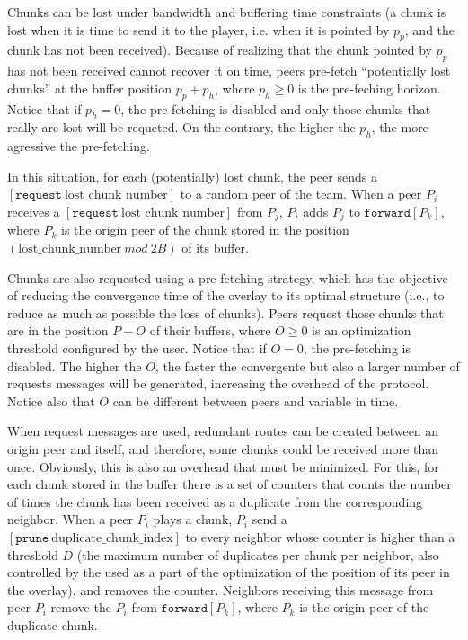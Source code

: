 

\label{sec:routes_discovery}

Chunks can be lost under bandwidth and buffering time constraints (a
chunk is lost when it is time to send it to the player, i.e. when it
is pointed by $p_p$, and the chunk has not been received). Because of
realizing that the chunk pointed by $p_p$ has not been received cannot
recover it on time, peers pre-fetch ``potentially lost chunks'' at the
buffer position $p_p+p_h$, where $p_h\geq 0$ is the pre-feching
horizon. Notice that if $p_h=0$, the pre-fetching is disabled and only
those chunks that really are lost will be requeted. On the contrary,
the higher the $p_h$, the more agressive the pre-fetching.

In this situation, for each (potentially) lost chunk, the peer sends a
$[\mathtt{request}~\text{lost\_chunk\_number}]$ to a random peer of
the team. When a peer $P_i$ receives a
$[\mathtt{request}~\text{lost\_chunk\_number}]$ from $P_j$, $P_i$ adds
$P_j$ to $\mathtt{forward}[P_k]$, where $P_k$ is the origin peer of
the chunk stored in the position
$(\text{lost\_chunk\_number}~\mathit{mod}~2B)$ of its buffer.

Chunks are also requested using a pre-fetching strategy, which has the
objective of reducing the convergence time of the overlay to its
optimal structure (i.e., to reduce as much as possible the loss of
chunks). Peers request those chunks that are in the position $P+O$ of
their buffers, where $O\geq 0$ is an optimization threshold configured
by the user. Notice that if $O=0$, the pre-fetching is disabled. The
higher the $O$, the faster the convergente but also a larger number of
requests messages will be generated, increasing the overhead of the
protocol. Notice also that $O$ can be different between peers and
variable in time.

When request messages are used, redundant routes can be created
between an origin peer and itself, and therefore, some chunks could be
received more than once. Obviously, this is also an overhead that must
be minimized. For this, for each chunk stored in the buffer there is a
set of counters that counts the number of times the chunk has been
received as a duplicate from the corresponding neighbor. When a peer
$P_i$ plays a chunk, $P_i$ send a
$[\mathtt{prune}~\text{duplicate\_chunk\_index}]$ to every neighbor
whose counter is higher than a threshold $D$ (the maximum number of
duplicates per chunk per neighbor, also controlled by the used as a
part of the optimization of the position of its peer in the overlay),
and removes the counter. Neighbors receiving this message from peer
$P_i$ remove the $P_i$ from $\mathtt{forward}[P_k]$, where $P_k$ is
the origin peer of the duplicate chunk.

